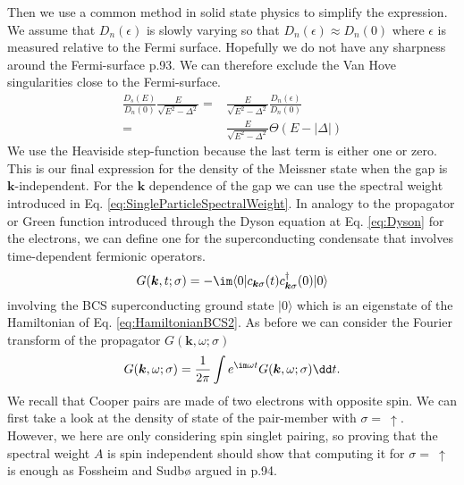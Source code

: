 \documentclass[../main.tex]{subfile}
\begin{document}
Then we use a common method in solid state physics to simplify the expression. We assume that $D_n(\epsilon)$ is slowly varying so that $D_n(\epsilon)\approx D_n(0)$
where $\epsilon$ is measured relative to the Fermi surface. Hopefully we do not have any sharpness around the Fermi-surface \cite{FossheimSudbo2004} p.93. 
We can therefore exclude the Van Hove singularities close to the Fermi-surface.
\begin{align*}
    \frac{D_s(E)}{D_n(0)} \frac{E}{\sqrt{E^2-\Delta^2}} =& \frac{E}{\sqrt{E^2-\Delta^2}}\frac{D_n(\epsilon)}{D_n(0)}\\
    =&\frac{E}{\sqrt{E^2-\Delta^2}} \Theta (E- |\Delta|)
\end{align*}
We use the Heaviside step-function because the last term is either one or zero. This is our final expression for the density of the Meissner 
state when the gap is $\bm{k}$-independent.
For the $\bm{k}$ dependence of the gap we can use the spectral weight introduced in Eq. \ref{eq:SingleParticleSpectralWeight}.
In analogy to the propagator or Green function introduced through the Dyson equation at Eq. \ref{eq:Dyson} for the electrons, we can define one for the 
superconducting condensate that involves time-dependent fermionic operators.
\[
    G(\bm{k}, t; \sigma) = - \im \langle 0 | c_{\bm{k}\sigma}(t) c_{\bm{k}\sigma}^{\dagger}(0) | 0 \rangle
\]
involving the BCS superconducting ground state $|0\rangle$ which is an eigenstate of the Hamiltonian of Eq. \ref{eq:HamiltonianBCS2}. As before we can consider
the Fourier transform of the propagator $G(\bm{k}, \omega; \sigma)$  
\[
    G(\bm{k}, \omega; \sigma) = \frac{1}{2\pi} \int e^{\im\omega t} G(\bm{k}, \omega; \sigma)\dd t.
\] 
We recall that Cooper pairs are made of two electrons with opposite spin. We can first take a 
look at the density of state of the pair-member with $\sigma =~ \uparrow$. 
However, we here are only considering spin singlet pairing, so proving that the spectral weight $A$ is spin independent should
show that computing it for $\sigma =~ \uparrow$ is enough as Fossheim and Sudbø argued in \cite{FossheimSudbo2004} p.94.\\
\end{document}
